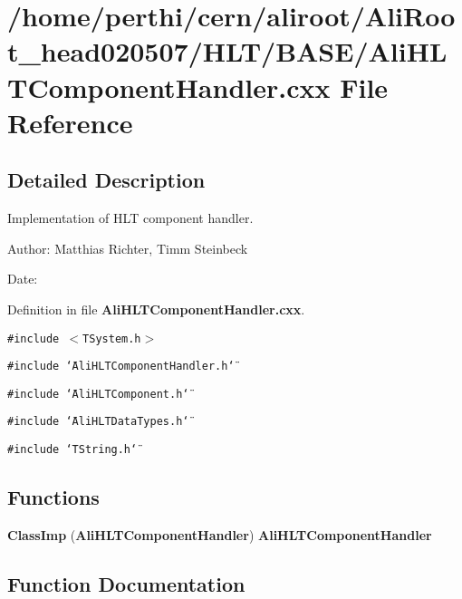 \section{/home/perthi/cern/aliroot/Ali\-Root\_\-head020507/HLT/BASE/Ali\-HLTComponent\-Handler.cxx File Reference}
\label{AliHLTComponentHandler_8cxx}


\subsection{Detailed Description}
Implementation of HLT component handler. 

\begin{Desc}
\item[Author:]Matthias Richter, Timm Steinbeck \end{Desc}
\begin{Desc}
\item[Date:]\end{Desc}


Definition in file {\bf Ali\-HLTComponent\-Handler.cxx}.

{\tt \#include $<$TSystem.h$>$}\par
{\tt \#include \char`\"{}Ali\-HLTComponent\-Handler.h\char`\"{}}\par
{\tt \#include \char`\"{}Ali\-HLTComponent.h\char`\"{}}\par
{\tt \#include \char`\"{}Ali\-HLTData\-Types.h\char`\"{}}\par
{\tt \#include \char`\"{}TString.h\char`\"{}}\par
\subsection*{Functions}
\begin{CompactItemize}
\item 
{\bf Class\-Imp} ({\bf Ali\-HLTComponent\-Handler}) {\bf Ali\-HLTComponent\-Handler}
\end{CompactItemize}


\subsection{Function Documentation}
